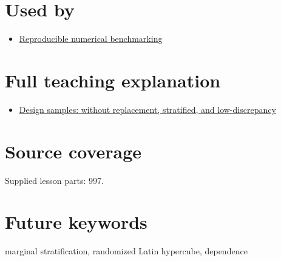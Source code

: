 \section{Used by}\label{appendix-1c5e85693a06-used-by}

\begin{itemize}
\tightlist
\item
  \hyperref[appendix-b9db93e28371]{Reproducible numerical benchmarking}
\end{itemize}

\section{Full teaching explanation}\label{appendix-1c5e85693a06-full-teaching-explanation}

\begin{itemize}
\tightlist
\item
  \href{Continuous\%20Notes/Computing\%20Foundations\%20-\%20From\%20Bits\%20to\%20C++\%20and\%20Systems\%20APIs\#Design\%20samples:\%20without\%20replacement,\%20stratified,\%20and\%20low-discrepancy}{Design samples: without replacement, stratified, and low-discrepancy}
\end{itemize}

\section{Source coverage}\label{appendix-1c5e85693a06-source-coverage}

Supplied lesson parts: 997.

\section{Future keywords}\label{appendix-1c5e85693a06-future-keywords}

marginal stratification, randomized Latin hypercube, dependence
